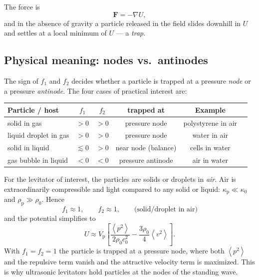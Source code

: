 \documentclass[11pt]{article}
\newcommand{\pp}{\rho_{\mathrm{p}}}
\newcommand{\rrho}{\rho_{0}}
\newcommand{\cc}{c_{0}}
\newcommand{\kkp}{\kappa_{\mathrm{p}}}
\newcommand{\kkz}{\kappa_{0}}
\newcommand{\vp}{V_{\mathrm{p}}}
\newcommand{\avg}[1]{\left\langle #1 \right\rangle}
\newcommand{\vpSq}{\avg{p^{2}}}
\newcommand{\vvSq}{\avg{v^{2}}}
\begin{document}
The force is
\begin{equation}
  \mathbf{F}=-\nabla U,
  \label{eq:force}
\end{equation}
and in the absence of gravity a particle released in the field slides downhill in
$U$ and settles at a local minimum of $U$ --- a \emph{trap}.

\subsection{Physical meaning: nodes vs.\ antinodes}
\label{sec:nodes}

The sign of $f_{1}$ and $f_{2}$ decides whether a particle is trapped at a
pressure \emph{node} or a pressure \emph{antinode}. The four cases of practical
interest are:

\begin{center}
\begin{tabular}{lccccl}
\hline
Particle / host & $f_{1}$ & $f_{2}$ & trapped at & Example\\
\hline
solid in gas & $>0$ & $>0$ & pressure node & polystyrene in air\\
liquid droplet in gas & $>0$ & $>0$ & pressure node & water in air\\
solid in liquid & $\lesssim0$ & $>0$ & near node (balance) & cells in water\\
gas bubble in liquid & $<0$ & $<0$ & pressure antinode & air in water\\
\hline
\end{tabular}
\end{center}

For the levitator of interest, the particles are solids or droplets in
\emph{air}. Air is extraordinarily compressible and light compared to any solid
or liquid: $\kkp\ll\kkz$ and $\pp\gg\rrho$. Hence
\begin{equation}
  f_{1}\approx1,\qquad f_{2}\approx1,
  \qquad\text{(solid/droplet in air)}
  \label{eq:airlimits}
\end{equation}
and the potential simplifies to
\begin{equation}
  U\approx \vp\left[
     \frac{\vpSq}{2\rrho\cc^{2}}
    -\frac{3\rrho}{4}\vvSq
  \right].
  \label{eq:gor'kov_air}
\end{equation}
With $f_{1}=f_{2}=1$ the particle is trapped at a pressure node, where both
$\vpSq$ and the repulsive term vanish and the attractive velocity term is
maximized. This is why ultrasonic levitators hold particles at the nodes of the
standing wave.
\end{document}
